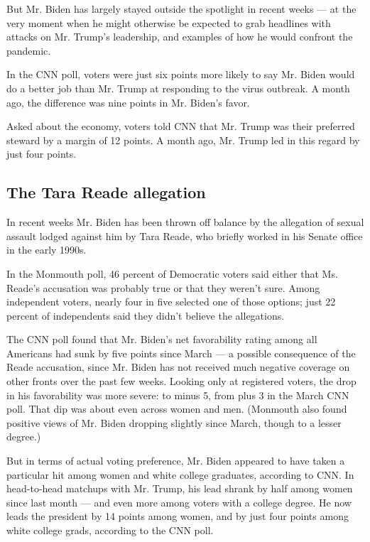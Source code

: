 But Mr. Biden has largely stayed outside the spotlight in recent weeks
--- at the very moment when he might otherwise be expected to grab
headlines with attacks on Mr. Trump's leadership, and examples of how he
would confront the pandemic.

In the CNN poll, voters were just six points more likely to say Mr.
Biden would do a better job than Mr. Trump at responding to the virus
outbreak. A month ago, the difference was nine points in Mr. Biden's
favor.

Asked about the economy, voters told CNN that Mr. Trump was their
preferred steward by a margin of 12 points. A month ago, Mr. Trump led
in this regard by just four points.

\hypertarget{the-tara-reade-allegation}{%
\subsection{The Tara Reade allegation}\label{the-tara-reade-allegation}}

In recent weeks Mr. Biden has been thrown off balance by the allegation
of sexual assault lodged against him by Tara Reade, who briefly worked
in his Senate office in the early 1990s.

In the Monmouth poll, 46 percent of Democratic voters said either that
Ms. Reade's accusation was probably true or that they weren't sure.
Among independent voters, nearly four in five selected one of those
options; just 22 percent of independents said they didn't believe the
allegations.

The CNN poll found that Mr. Biden's net favorability rating among all
Americans had sunk by five points since March --- a possible consequence
of the Reade accusation, since Mr. Biden has not received much negative
coverage on other fronts over the past few weeks. Looking only at
registered voters, the drop in his favorability was more severe: to
minus 5, from plus 3 in the March CNN poll. That dip was about even
across women and men. (Monmouth also found positive views of Mr. Biden
dropping slightly since March, though to a lesser degree.)

But in terms of actual voting preference, Mr. Biden appeared to have
taken a particular hit among women and white college graduates,
according to CNN. In head-to-head matchups with Mr. Trump, his lead
shrank by half among women since last month --- and even more among
voters with a college degree. He now leads the president by 14 points
among women, and by just four points among white college grads,
according to the CNN poll.

